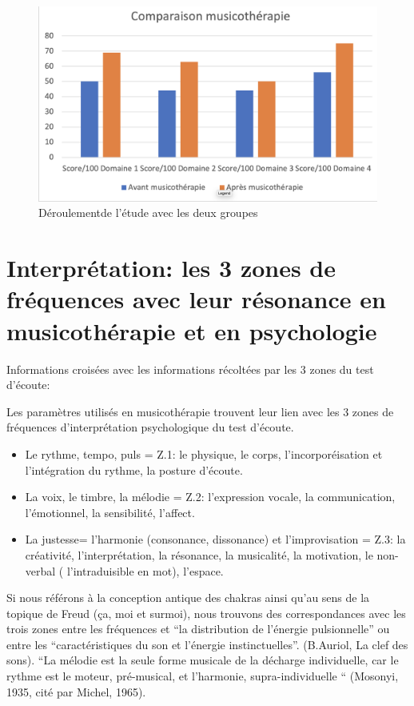 \begin{figure}
\centering
\includegraphics[width=0.7\linewidth]{images/Compmusico.png}
\caption[Schéma du déroulement]{Déroulementde l'étude avec les
         deux groupes}
       
\label{groupecontroleimage1}
\end{figure}



   


\section{Interprétation: les 3 zones de fréquences avec leur résonance en musicothérapie et en
  psychologie}


	Informations croisées avec les informations récoltées par les 3 
          zones du test d'écoute:
          
Les paramètres utilisés en musicothérapie trouvent leur lien avec les
3 zones de fréquences d'interprétation psychologique du test d'écoute.
\begin{itemize}
 \item Le rythme, tempo, puls  =  Z.1: le physique, le corps, l'incorporéisation et
l'intégration du rythme,
la posture d'écoute.

\item La voix, le timbre, la mélodie =  Z.2:  l'expression vocale, la communication,
l'émotionnel, la sensibilité, l'affect.

\item La justesse= l'harmonie (consonance, dissonance) et l'improvisation = Z.3:  la créativité, l'interprétation, la
résonance, la musicalité, la motivation, le non-verbal (
l'intraduisible en mot), l'espace.
\end{itemize}

Si nous référons à la conception antique des chakras ainsi qu'au sens de la
topique de Freud (ça, moi et surmoi), nous trouvons des correspondances
avec les trois zones entre les
fréquences et ``la distribution de l'énergie pulsionnelle'' ou entre
les 
``caractéristiques du son et l'énergie instinctuelles''. (B.Auriol, La
clef des sons).
``La mélodie est la seule forme musicale de la décharge individuelle, car le rythme est le moteur, pré-musical, et l'harmonie, supra-individuelle `` (Mosonyi, 1935, cité par Michel, 1965).

